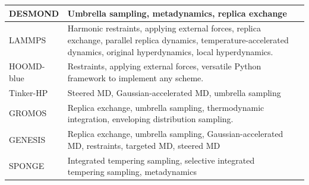 \documentclass[9pt,review]{livecoms}
\begin{document}
\begin{table}[!ht]
\begin{tabularx}{0.95\textwidth}{
  || >{\raggedright\arraybackslash} l
  || >{\raggedright\arraybackslash}X
  | >{\raggedright\arraybackslash}l ||}
DESMOND & Umbrella sampling, metadynamics, replica exchange & \cite{Desmond2006} \\
\hline
LAMMPS  & Harmonic restraints, applying external forces, replica exchange, parallel replica dynamics, temperature-accelerated dynamics, original hyperdynamics, local hyperdynamics. &  \cite{LAMMPS_2022}\\
\hline
HOOMD-blue &  Restraints, applying external forces, versatile Python framework to implement any scheme. & \cite{HOOMD-blue_2020} \\
\hline
Tinker-HP & Steered MD, Gaussian-accelerated MD, umbrella sampling & \cite{Celerse2019,Celerse2021} \\
\hline
GROMOS & Replica exchange, umbrella sampling, thermodynamic integration, enveloping distribution sampling.  & \cite{Gromos_2012} \\
\hline
GENESIS & Replica exchange, umbrella sampling, Gaussian-accelerated MD, restraints, targeted MD, steered MD  & \cite{GENESIS_MD_Code_2017} \\
\hline
SPONGE & Integrated tempering sampling, selective integrated tempering sampling, metadynamics & \cite{SPONGE_MD_Code_2022} \\
\hline
\end{tabularx}
\end{table}
\end{document}
